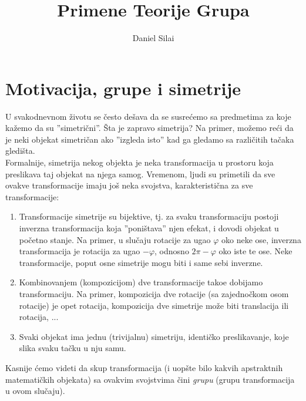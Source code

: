 \documentclass[times, utf8, diplomski]{fer}
\theoremstyle{plain}
\theoremstyle{definition}
\begin{document}
\title{Primene Teorije Grupa}

\author{Daniel Sila\dj i}

\maketitle

\zahvala{}

\tableofcontents

\chapter{Motivacija, grupe i simetrije}
U svakodnevnom \v zivotu se \v cesto de\v sava da se susre\'cemo sa predmetima za koje ka\v zemo da su ''simetri\v cni''. \v Sta je zapravo simetrija? Na primer, mo\v zemo re\'ci da je neki objekat simetri\v can ako ''izgleda isto'' kad ga gledamo sa razli\v citih ta\v caka gledi\v sta.\\
Formalnije, simetrija nekog objekta je neka transformacija u prostoru koja preslikava taj objekat na njega samog. Vremenom, ljudi su primetili da sve ovakve transformacije imaju jo\v s neka svojstva, karakteristi\v cna za sve transformacije:
\begin{enumerate}
  \item Transformacije simetrije su bijektive, tj. za svaku transformaciju postoji inverzna transformacija koja ''poni\v stava'' njen efekat, i dovodi objekat u po\v cetno stanje. Na primer, u slu\v caju rotacije za ugao $\varphi$ oko neke ose, inverzna transformacija je rotacija za ugao $-\varphi$, odnosno $2\pi-\varphi$ oko iste te ose. Neke transformacije, poput osne simetrije mogu biti i same sebi inverzne.
  \item Kombinovanjem (kompozicijom) dve transformacije tako\dj e dobijamo transformaciju. Na primer, kompozicija dve rotacije (sa zajedno\v ckom osom rotacije) je opet rotacija, kompozicija dve simetrije mo\v ze biti translacija ili rotacija, ...
  \item Svaki objekat ima jednu (trivijalnu) simetriju, identi\v cko preslikavanje, koje slika svaku ta\v cku u nju samu.
\end{enumerate}
Kasnije \'cemo videti da skup transformacija (i uop\v ste bilo kakvih apstraktnih matemati\v ckih objekata) sa ovakvim svojstvima \v cini \emph{grupu} (grupu transformacija u ovom slu\v caju).
\end{document}
